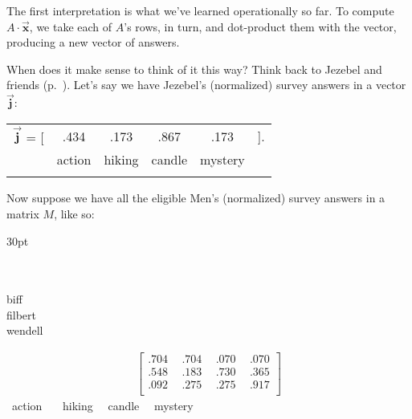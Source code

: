 The first interpretation is what we've learned operationally so far. To compute
$A \cdot \overrightarrow{\textbf{x}}$, we take each of $A$'s rows, in turn, and
dot-product them with the vector, producing a new vector of answers.


When does it make sense to think of it this way? Think back to Jezebel and
friends (p.~\pageref{matchmakerExample}). Let's say we have Jezebel's
(normalized) survey answers in a vector $\overrightarrow{\textbf{j}}$:

\begin{center}
\begin{tabular}{cccccc}
$\overrightarrow{\textbf{j}}$ = [ & .434 & .173 & .867 & .173 & ]. \\
& \scriptsize{action} & \scriptsize{hiking} & \scriptsize{candle} &
\scriptsize{mystery} & \\
\normalsize
\end{tabular}
\end{center}
\vspace{-.15in}

Now suppose we have all the eligible Men's (normalized) survey answers in a
matrix $M$, like so:

\vspace{-.3in} 
\begin{adjustwidth}{}{30pt}
\begin{center}
\begin{multicols}{2}
\begin{flushright}
\hspace*{1cm} \\
\hspace*{1cm} \\
\footnotesize{biff} \\
\footnotesize{filbert} \\
\footnotesize{wendell} \\
\end{flushright}
\columnbreak
\vspace{-1.5in} 
\begin{align*}
\begin{bmatrix}
.704 \ & \ .704 \ & \ .070 \ & \ .070 \\
.548 \ & \ .183 \ & \ .730 \ & \ .365 \\
.092 \ & \ .275 \ & \ .275 \ & \ .917 \\
\end{bmatrix}
\end{align*}
\vspace{-.15in}
\hspace*{-.1in}
\ \scriptsize{action} \ \ \ \scriptsize{hiking} \ \  \scriptsize{candle} \ \ 
\scriptsize{mystery} \\
\end{multicols}
\end{center}
\end{adjustwidth}
\vspace{-.15in}

